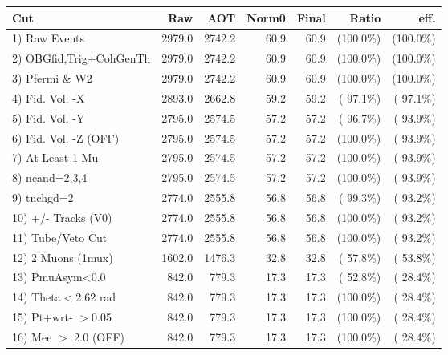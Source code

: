  \begin{table}[h!]\centering
 \begin{tabular}{||l||r|r|r|r|r|r||}
 \hline
 \hline
 Cut & Raw & AOT & Norm0 & Final & Ratio & eff.       \\
 \hline
  1) Raw Events           &       2979.0 &       2742.2 &         60.9 &         60.9 & (100.0\%) & (100.0\%) \\
  2) OBGfid,Trig+CohGenTh &       2979.0 &       2742.2 &         60.9 &         60.9 & (100.0\%) & (100.0\%) \\
  3) Pfermi \& W2         &       2979.0 &       2742.2 &         60.9 &         60.9 & (100.0\%) & (100.0\%) \\
  4) Fid. Vol. -X         &       2893.0 &       2662.8 &         59.2 &         59.2 & ( 97.1\%) & ( 97.1\%) \\
  5) Fid. Vol. -Y         &       2795.0 &       2574.5 &         57.2 &         57.2 & ( 96.7\%) & ( 93.9\%) \\
  6) Fid. Vol. -Z (OFF)   &       2795.0 &       2574.5 &         57.2 &         57.2 & (100.0\%) & ( 93.9\%) \\
  7) At Least 1 Mu        &       2795.0 &       2574.5 &         57.2 &         57.2 & (100.0\%) & ( 93.9\%) \\
  8) ncand=2,3,4          &       2795.0 &       2574.5 &         57.2 &         57.2 & (100.0\%) & ( 93.9\%) \\
  9) tnchgd=2             &       2774.0 &       2555.8 &         56.8 &         56.8 & ( 99.3\%) & ( 93.2\%) \\
 10) +/- Tracks (V0)      &       2774.0 &       2555.8 &         56.8 &         56.8 & (100.0\%) & ( 93.2\%) \\
 11) Tube/Veto Cut        &       2774.0 &       2555.8 &         56.8 &         56.8 & (100.0\%) & ( 93.2\%) \\
 12) 2 Muons (1mux)       &       1602.0 &       1476.3 &         32.8 &         32.8 & ( 57.8\%) & ( 53.8\%) \\
 13) PmuAsym<0.0          &        842.0 &        779.3 &         17.3 &         17.3 & ( 52.8\%) & ( 28.4\%) \\
 14) Theta$<$2.62 rad     &        842.0 &        779.3 &         17.3 &         17.3 & (100.0\%) & ( 28.4\%) \\
 15) Pt+wrt- $>$0.05      &        842.0 &        779.3 &         17.3 &         17.3 & (100.0\%) & ( 28.4\%) \\
 16) Mee $>$ 2.0  (OFF)   &        842.0 &        779.3 &         17.3 &         17.3 & (100.0\%) & ( 28.4\%) \\

\end{tabular}
\end{table}
